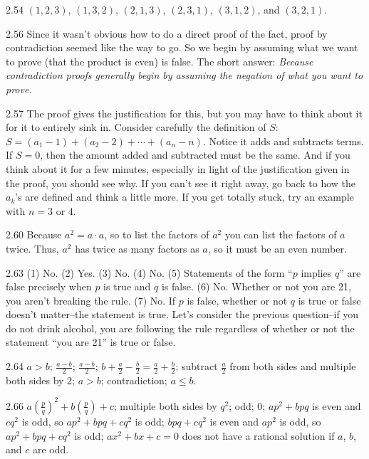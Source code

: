 \begin{Answer}{2.54}
$(1,2,3)$, $(1,3,2)$, $(2,1,3)$, $(2,3,1)$, $(3,1,2)$, and $(3,2,1)$.
\end{Answer}
\begin{Answer}{2.56}
Since it wasn't obvious how to do a direct proof of the fact, proof by contradiction seemed like
the way to go.  So we begin by assuming what we want to prove (that the product is even) is false.
The short answer: {\em Because contradiction proofs generally begin by assuming the negation of what
you want to prove.}
\end{Answer}
\begin{Answer}{2.57}
The proof gives the justification for this, but you may have to think about it
for it to entirely sink in.
Consider carefully the definition of $S$:
$S = (a_1 - 1) + (a_2 - 2) + \cdots + (a_n - n).$
Notice it adds and subtracts terms.  If $S=0$, then the amount added and subtracted
must be the same.  And if you think about it for a few minutes, especially in light
of the justification given in the proof, you should see why.
If you can't see it right away, go back to how the $a_k$'s are defined and think a little more.
If you get totally stuck, try an example with $n=3$ or $4$.
\end{Answer}
\begin{Answer}{2.60}
Because $a^2=a\cdot a$, so to list the factors of $a^2$ you can list the factors of $a$ twice.
Thus, $a^2$ has twice as many factors as $a$, so it must be an even number.
\end{Answer}
\begin{Answer}{2.63}
(1) No. (2) Yes. (3) No. (4) No.
(5) Statements of the form ``$p$ implies $q$'' are false
precisely when $p$ is true and $q$ is false.
(6)  No.  Whether or not you are 21, you aren't breaking the rule.
(7) No.  If $p$ is false, whether or not $q$ is true or false doesn't matter--the statement is true.
Let's consider the previous question--if you do not drink alcohol, you are following the rule
regardless of whether or not the statement ``you are 21'' is true or false.
\end{Answer}
\begin{Answer}{2.64}
$a > b$; $\frac{a - b}{2}$; $\frac{a - b}{2}$; $b+\frac{a}{2}-\frac{b}{2}=\frac{a}{2}+\frac{b}{2}$;
subtract $\frac{a}{2}$ from both sides and multiple both sides by $2$;
$a > b$; contradiction; $a\leq b$.
\end{Answer}
\begin{Answer}{2.66}
$a\left(\frac{p}{q}\right)^2 + b\left(\frac{p}{q}\right) + c$;
multiple both sides by $q^2$;
odd;
0;
$ap^2 + bpq$ is even and $cq^2$ is odd, so  $ap^2 + bpq + cq^2$ is odd;
$bpq + cq^2$ is even and $ap^2$ is odd, so  $ap^2 + bpq + cq^2$ is odd;
$ax^2 + bx + c = 0$ does not have a rational solution if $a$, $b$, and $c$ are odd.
\end{Answer}
